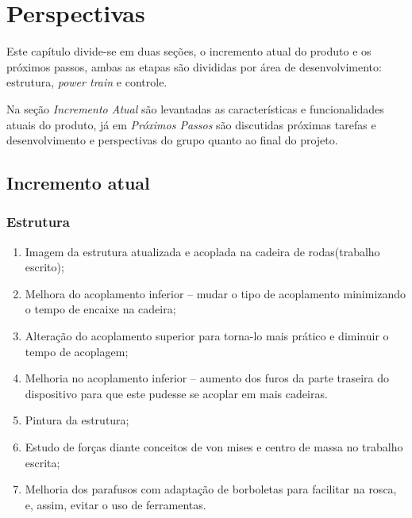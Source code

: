 \chapter[Perspectivas]{Perspectivas}

Este capítulo divide-se em duas seções, o incremento atual do produto e os próximos passos, ambas as etapas são divididas por área de desenvolvimento: estrutura, \textit{power train} e controle.

Na seção \textit{Incremento Atual} são levantadas as características e funcionalidades atuais do produto, já em \textit{Próximos Passos} são discutidas próximas tarefas e desenvolvimento e perspectivas do grupo quanto ao final do projeto.

\section{Incremento atual}
  \subsection{Estrutura}
    \begin{enumerate}
      \item Imagem da estrutura  atualizada e acoplada na cadeira de rodas(trabalho escrito);
      \item Melhora do acoplamento inferior – mudar o tipo de acoplamento minimizando o tempo de encaixe na cadeira;
      \item Alteração do acoplamento superior para torna-lo mais prático e diminuir o tempo de acoplagem;
      \item Melhoria no acoplamento inferior – aumento dos furos da parte traseira do dispositivo para que este pudesse se acoplar em mais cadeiras.
      \item Pintura da estrutura;
      \item Estudo de forças diante conceitos de von mises e centro de massa no trabalho escrita;
    	\item Melhoria dos parafusos com adaptação de borboletas para facilitar na rosca, e, assim, evitar o uso de ferramentas.
    \end{enumerate}

